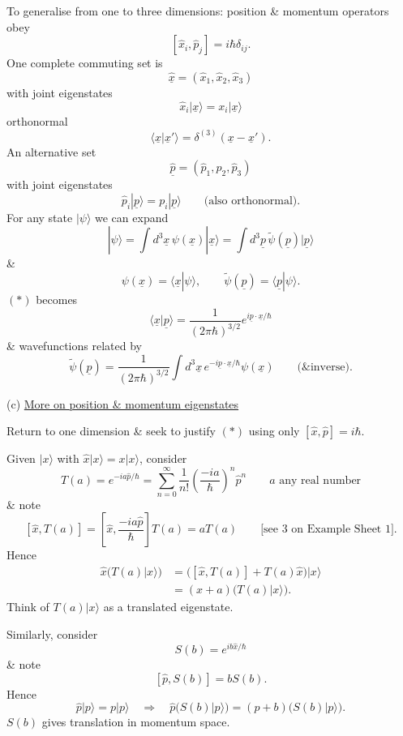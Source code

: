 \documentclass[11pt,a4paper]{article}
\begin{document}
To generalise from one to three dimensions: position \& momentum operators obey
\[
    [\hat{x}_i,\hat{p}_j]=i\hbar\delta_{ij}.
\]
One complete commuting set is
\[
    \underline{\hat{x}}=(\hat{x}_1,\hat{x}_2,\hat{x}_3)
\]
with joint eigenstates
\[
    \hat{x}_i|\underline{x}\rangle=x_i|\underline{x}\rangle
\]
orthonormal
\[
    \langle\underline{x}|\underline{x}'\rangle
    =\delta^{(3)}(\underline{x}-\underline{x}').
\]
An alternative set
\[
    \underline{\hat{p}}=(\hat{p}_1,\hat{p}_2,\hat{p}_3)
\]
with joint eigenstates
\[
    \hat{p}_i|\underline{p}\rangle=p_i|\underline{p}\rangle
    \qquad\text{(also orthonormal)}.
\]
For any state $|\psi\rangle$ we can expand
\[
    |\psi\rangle=\int d^3\underline{x}\,\psi(\underline{x})|\underline{x}\rangle
    =\int d^3\underline{p}\,\tilde{\psi}(\underline{p})|\underline{p}\rangle
\]
\&
\[
    \psi(\underline{x})=\langle\underline{x}|\psi\rangle,
    \qquad\tilde{\psi}(\underline{p})=\langle\underline{p}|\psi\rangle.
\]
$(*)$ becomes
\[
    \langle\underline{x}|\underline{p}\rangle
    =\frac{1}{(2\pi\hbar)^{3/2}}e^{i\underline{p}\cdot\underline{x}/\hbar}
\]
\& wavefunctions related by
\[
    \tilde{\psi}(\underline{p})=\frac{1}{(2\pi\hbar)^{3/2}}
    \int d^3\underline{x}\,e^{-i\underline{p}\cdot\underline{x}/\hbar}\psi(\underline{x})
    \qquad\text{(\& inverse)}.
\]

\medskip
\noindent
(c) \underline{More on position \& momentum eigenstates}

Return to one dimension \& seek to justify $(*)$ using only
$[\hat{x},\hat{p}]=i\hbar$.

Given $|x\rangle$ with $\hat{x}|x\rangle=x|x\rangle$, consider
\[
    T(a)=e^{-ia\hat{p}/\hbar}
    =\sum_{n=0}^{\infty}\frac{1}{n!}\left(\frac{-ia}{\hbar}\right)^n\hat{p}^n
    \qquad a\text{ any real number}
\]
\& note
\[
    [\hat{x},T(a)]=\left[\hat{x},\frac{-ia\hat{p}}{\hbar}\right]T(a)=aT(a)
    \qquad\text{[see 3 on Example Sheet 1]}.
\]
Hence
\begin{align*}
    \hat{x}\bigl(T(a)|x\rangle\bigr)
    &=\bigl([\hat{x},T(a)]+T(a)\hat{x}\bigr)|x\rangle\\
    &=(x+a)\bigl(T(a)|x\rangle\bigr).
\end{align*}
Think of $T(a)|x\rangle$ as a translated eigenstate.

Similarly, consider
\[
    S(b)=e^{ib\hat{x}/\hbar}
\]
\& note
\[
    [\hat{p},S(b)]=bS(b).
\]
Hence
\[
    \hat{p}|p\rangle=p|p\rangle
    \quad\Rightarrow\quad
    \hat{p}\bigl(S(b)|p\rangle\bigr)=(p+b)\bigl(S(b)|p\rangle\bigr).
\]
$S(b)$ gives translation in momentum space.
\end{document}
